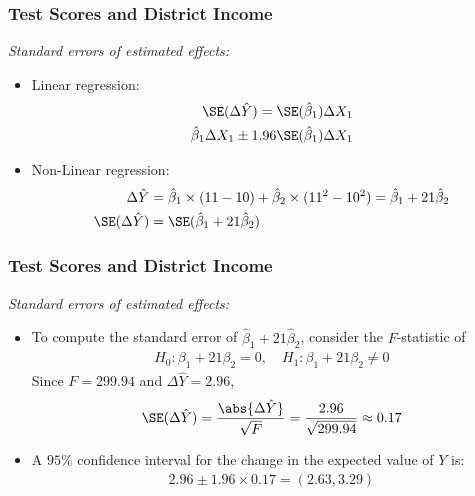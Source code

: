 \begin{frame}
\frametitle{Test Scores and District Income}
\emph{Standard errors of estimated effects:}
\begin{itemize}
\item Linear regression: 
\begin{align*}
\SE(\Delta\hat{Y}) = \SE(\hat{\beta}_{1}) \Delta X_{1} \\
\hat{\beta}_{1}\Delta X_{1} \pm 1.96 \SE(\hat{\beta}_{1}) \Delta X_{1} 
\end{align*}
\item Non-Linear regression: 
\begin{align*}
\Delta\hat{Y} 
    & = \hat{\beta}_{1} \times (11-10) + \hat{\beta}_{2} \times (11^2-10^2)
      = \hat{\beta}_{1} + 21 \hat{\beta}_{2}\\
\SE(\Delta\hat{Y}) 
    & = \SE(\hat{\beta}_{1}+21\hat{\beta}_{2})
\end{align*}
\end{itemize}
\end{frame}


\begin{frame}
\frametitle{Test Scores and District Income}
\emph{Standard errors of estimated effects:}
\begin{itemize}
\item To compute the standard error of $\hat{\beta}_{1} + 21 \hat{\beta}_{2}$, consider the $F$-statistic of
\begin{align*}
H_{0}\colon \beta_{1} + 21 \beta_{2} = 0, \quad
H_{1}\colon \beta_{1} + 21 \beta_{2} \ne 0
\end{align*}
Since $F=299.94$ and $\Delta\hat{Y}=2.96$,
\begin{align*}
\SE(\Delta\hat{Y}) 
     = \frac{\abs{\Delta\hat{Y}}}{\sqrt{F}}
     = \frac{2.96}{\sqrt{299.94}}
     \approx 0.17
\end{align*}
\item A $95\%$ confidence interval for the change in the expected value of $Y$ is:
\begin{align*}
2.96 \pm 1.96 \times 0.17 = (2.63, 3.29)
\end{align*}
\end{itemize}
\end{frame}



